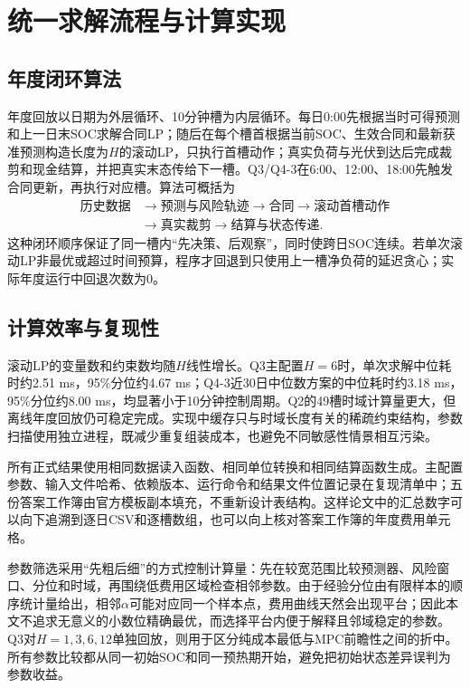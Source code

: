 \documentclass[UTF8,12pt,a4paper]{ctexart}
\theoremstyle{remark}
\begin{document}
\section{统一求解流程与计算实现}
\subsection{年度闭环算法}
年度回放以日期为外层循环、10分钟槽为内层循环。每日0:00先根据当时可得预测和上一日末SOC求解合同LP；随后在每个槽首根据当前SOC、生效合同和最新获准预测构造长度为$H$的滚动LP，只执行首槽动作；真实负荷与光伏到达后完成裁剪和现金结算，并把真实末态传给下一槽。Q3/Q4-3在6:00、12:00、18:00先触发合同更新，再执行对应槽。算法可概括为
\[
\begin{aligned}
\text{历史数据}&\rightarrow\text{预测与风险轨迹}\rightarrow\text{合同}\rightarrow\text{滚动首槽动作}\\
&\rightarrow\text{真实裁剪}\rightarrow\text{结算与状态传递}.
\end{aligned}
\]
这种闭环顺序保证了同一槽内“先决策、后观察”，同时使跨日SOC连续。若单次滚动LP非最优或超过时间预算，程序才回退到只使用上一槽净负荷的延迟贪心；实际年度运行中回退次数为0。

\subsection{计算效率与复现性}
滚动LP的变量数和约束数均随$H$线性增长。Q3主配置$H=6$时，单次求解中位耗时约2.51 ms，95\%分位约4.67 ms；Q4-3近30日中位数方案的中位耗时约3.18 ms，95\%分位约8.00 ms，均显著小于10分钟控制周期。Q2的49槽时域计算量更大，但离线年度回放仍可稳定完成。实现中缓存只与时域长度有关的稀疏约束结构，参数扫描使用独立进程，既减少重复组装成本，也避免不同敏感性情景相互污染。

所有正式结果使用相同数据读入函数、相同单位转换和相同结算函数生成。主配置参数、输入文件哈希、依赖版本、运行命令和结果文件位置记录在复现清单中；五份答案工作簿由官方模板副本填充，不重新设计表结构。这样论文中的汇总数字可以向下追溯到逐日CSV和逐槽数组，也可以向上核对答案工作簿的年度费用单元格。

参数筛选采用“先粗后细”的方式控制计算量：先在较宽范围比较预测器、风险窗口、分位和时域，再围绕低费用区域检查相邻参数。由于经验分位由有限样本的顺序统计量给出，相邻$\alpha$可能对应同一个样本点，费用曲线天然会出现平台；因此本文不追求无意义的小数位精确最优，而选择平台内便于解释且邻域稳定的参数。Q3对$H=1,3,6,12$单独回放，则用于区分纯成本最低与MPC前瞻性之间的折中。所有参数比较都从同一初始SOC和同一预热期开始，避免把初始状态差异误判为参数收益。
\end{document}
